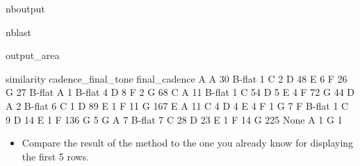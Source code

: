 \documentclass[letterpaper,10pt,english]{sphinxmanual}
\begin{document}
\begin{sphinxuseclass}{nboutput}
\begin{sphinxuseclass}{nblast}
{\begin{sphinxuseclass}{output_area}
\begin{sphinxuseclass}{}
\begin{sphinxVerbatim}[commandchars=\\\{\}]
                                  similarity
cadence\_final\_tone final\_cadence
A                  A                      30
                   B-flat                  1
                   C                       2
                   D                      48
                   E                       6
                   F                      26
                   G                      27
B-flat             A                       1
                   B-flat                  4
                   D                       8
                   F                       2
                   G                      68
C                  A                      11
                   B-flat                  1
                   C                      54
                   D                       5
                   E                       4
                   F                      72
                   G                      44
D                  A                       2
                   B-flat                  6
                   C                       1
                   D                      89
                   E                       1
                   F                      11
                   G                     167
E                  A                      11
                   C                       4
                   D                       4
                   E                       4
                   F                       1
                   G                       7
F                  B-flat                  1
                   C                       9
                   D                      14
                   E                       1
                   F                     136
                   G                       5
G                  A                       7
                   B-flat                  7
                   C                      28
                   D                      23
                   E                       1
                   F                      14
                   G                     225
None               A                       1
                   G                       1
\end{sphinxVerbatim}



\end{sphinxuseclass}
\end{sphinxuseclass}
}

\end{sphinxuseclass}
\end{sphinxuseclass}\begin{itemize}
\item {} 
\sphinxAtStartPar
Compare the result of the  method to the one you already know for displaying the first 5 rows.

\end{itemize}
\end{document}
